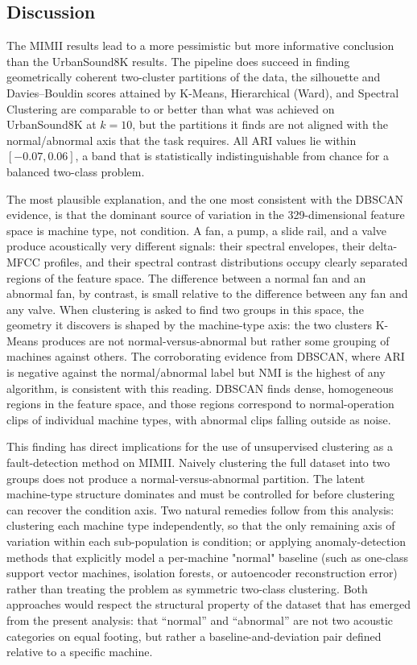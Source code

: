\documentclass[runningheads,a4paper,11pt]{report}
\begin{document}
\subsection{Discussion}
\label{section:discussionMIMII}

The MIMII results lead to a more pessimistic but more informative conclusion than the UrbanSound8K results. The pipeline does succeed in finding geometrically coherent two-cluster partitions of the data, the silhouette and Davies--Bouldin scores attained by K-Means, Hierarchical (Ward), and Spectral Clustering are comparable to or better than what was achieved on UrbanSound8K at $k = 10$, but the partitions it finds are not aligned with the normal/abnormal axis that the task requires. All ARI values lie within $[-0.07, 0.06]$, a band that is statistically indistinguishable from chance for a balanced two-class problem.

The most plausible explanation, and the one most consistent with the DBSCAN evidence, is that the dominant source of variation in the 329-dimensional feature space is machine type, not condition. A fan, a pump, a slide rail, and a valve produce acoustically very different signals: their spectral envelopes, their delta-MFCC profiles, and their spectral contrast distributions occupy clearly separated regions of the feature space. The difference between a normal fan and an abnormal fan, by contrast, is small relative to the difference between any fan and any valve. When clustering is asked to find two groups in this space, the geometry it discovers is shaped by the machine-type axis: the two clusters K-Means produces are not normal-versus-abnormal but rather some grouping of machines against others. The corroborating evidence from DBSCAN, where ARI is negative against the normal/abnormal label but NMI is the highest of any algorithm, is consistent with this reading. DBSCAN finds dense, homogeneous regions in the feature space, and those regions correspond to normal-operation clips of individual machine types, with abnormal clips falling outside as noise.

This finding has direct implications for the use of unsupervised clustering as a fault-detection method on MIMII. Naively clustering the full dataset into two groups does not produce a normal-versus-abnormal partition. The latent machine-type structure dominates and must be controlled for before clustering can recover the condition axis. Two natural remedies follow from this analysis: clustering each machine type independently, so that the only remaining axis of variation within each sub-population is condition; or applying anomaly-detection methods that explicitly model a per-machine "normal" baseline (such as one-class support vector machines, isolation forests, or autoencoder reconstruction error) rather than treating the problem as symmetric two-class clustering. Both approaches would respect the structural property of the dataset that has emerged from the present analysis: that ``normal'' and ``abnormal'' are not two acoustic categories on equal footing, but rather a baseline-and-deviation pair defined relative to a specific machine.
\end{document}
